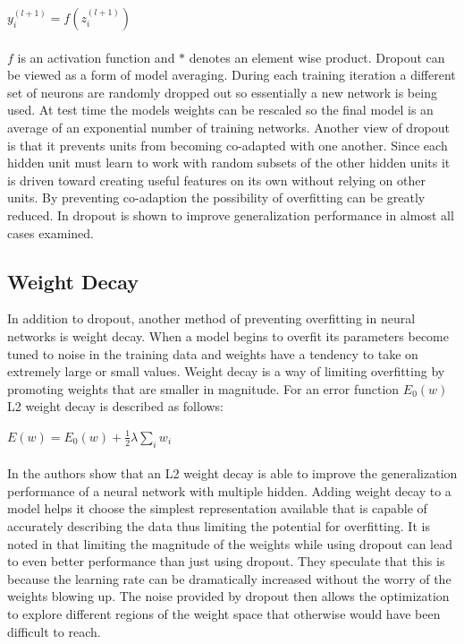 \documentclass[12pt,letterpaper]{article}
\begin{document}
$y_i^{(l + 1)} = f(z_i^{(l + 1)})$
\\
\\
$f$ is an activation function and $*$ denotes an element wise product.  Dropout can be viewed as a form of model averaging.  During each training iteration a different set of neurons are randomly dropped out so essentially a new network is being used.  At test time the models weights can be rescaled so the final model is an average of an exponential number of training networks.  Another view of dropout is that it prevents units from becoming co-adapted with one another.  Since each hidden unit must learn to work with random subsets of the other hidden units it is driven toward creating useful features on its own without relying on other units.  By preventing co-adaption the possibility of overfitting can be greatly reduced.  In \cite{Srivastava:2014:DSW:2627435.2670313} dropout is shown to improve generalization performance in almost all cases examined.

\subsection{Weight Decay}
In addition to dropout, another method of preventing overfitting in neural networks is weight decay.  When a model begins to overfit its parameters become tuned to noise in the training data and weights have a tendency to take on extremely large or small values.  Weight decay is a way of limiting overfitting by promoting weights that are smaller in magnitude. For an error function $E_0(w)$ L2 weight decay is described as follows:

$E(w) = E_0(w) + \frac{1}{2} \lambda \sum_i w_i$
\\
\\
In \cite{Krogh92asimple} the authors show that an L2 weight decay is able to improve the generalization performance of a neural network with multiple hidden.  Adding weight decay to a model helps it choose the simplest representation available that is capable of accurately describing the data thus limiting the potential for overfitting.  It is noted in \cite{Srivastava:2014:DSW:2627435.2670313} that limiting the magnitude of the weights while using dropout can lead to even better performance than just using dropout.  They speculate that this is because the learning rate can be dramatically increased without the worry of the weights blowing up.  The noise provided by dropout then allows the optimization to explore different regions of the weight space that otherwise would have been difficult to reach.
\end{document}
